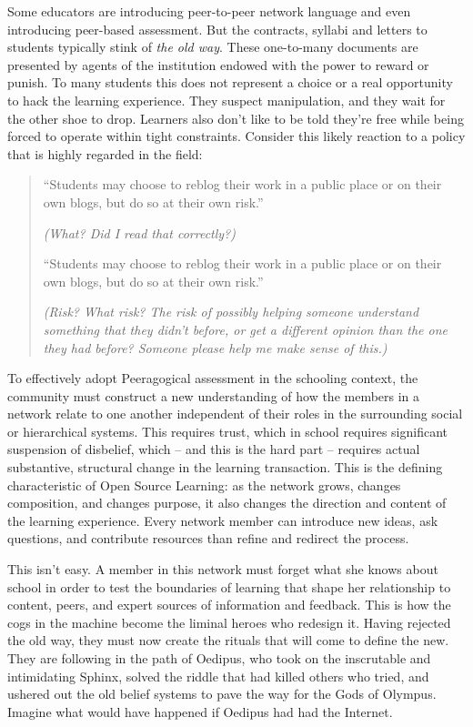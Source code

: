Some educators are introducing peer-to-peer network language and even
introducing peer-based assessment. But the contracts, syllabi and
letters to students typically stink of \emph{the old way}. These
one-to-many documents are presented by agents of the institution endowed
with the power to reward or punish. To many students this does not
represent a choice or a real opportunity to hack the learning
experience. They suspect manipulation, and they wait for the other shoe
to drop. Learners also don't like to be told they're free while being
forced to operate within tight constraints. Consider this likely
reaction to a policy that is highly regarded in the field:

\begin{quote}
``Students may choose to reblog their work in a public place or on their
own blogs, but do so at their own risk.''

\emph{(What? Did I read that correctly?)}

``Students may choose to reblog their work in a public place or on their
own blogs, but do so at their own risk.''

\emph{(Risk? What risk? The risk of possibly helping someone understand
something that they didn't before, or get a different opinion than the
one they had before? Someone please help me make sense of this.)}
\end{quote}

To effectively adopt Peeragogical assessment in the schooling context,
the community must construct a new understanding of how the members in a
network relate to one another independent of their roles in the
surrounding social or hierarchical systems. This requires trust, which
in school requires significant suspension of disbelief, which -- and
this is the hard part -- requires actual substantive, structural change
in the learning transaction. This is the defining characteristic of Open
Source Learning: as the network grows, changes composition, and changes
purpose, it also changes the direction and content of the learning
experience. Every network member can introduce new ideas, ask questions,
and contribute resources than refine and redirect the process.

This isn't easy. A member in this network must forget what she knows
about school in order to test the boundaries of learning that shape her
relationship to content, peers, and expert sources of information and
feedback. This is how the cogs in the machine become the liminal heroes
who redesign it. Having rejected the old way, they must now create the
rituals that will come to define the new. They are following in the path
of Oedipus, who took on the inscrutable and intimidating Sphinx, solved
the riddle that had killed others who tried, and ushered out the old
belief systems to pave the way for the Gods of Olympus.~ Imagine what
would have happened if Oedipus had had the Internet.
